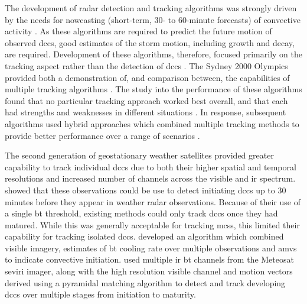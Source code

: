 The development of radar detection and tracking algorithms was strongly driven by the needs for nowcasting (short-term, 30- to 60-minute forecasts) of convective activity \citep{wilson_nowcasting_1998}.
As these algorithms are required to predict the future motion of observed \acrshort{dcc}s, good estimates of the storm motion, including growth and decay, are required.
Development of these algorithms, therefore, focused primarily on the tracking aspect rather than the detection of \acrshort{dcc}s \citep{lakshmanan_objective_2010}.
The Sydney 2000 Olympics provided both a demonstration of, and comparison between, the capabilities of multiple tracking algorithms \citep{keenan_sydney_2003}.
The study into the performance of these algorithms found that no particular tracking approach worked best overall, and that each had strengths and weaknesses in different situations \citep{wilson_sydney_2004}.
In response, subsequent algorithms used hybrid approaches which combined multiple tracking methods to provide better performance over a range of scenarios \citep{lakshmanan_warning_2007, han_3d_2009}.

The second generation of geostationary weather satellites provided greater capability to track individual \acrshort{dcc}s due to both their higher spatial and temporal resolutions and increased number of channels across the visible and \acrshort{ir} spectrum.
\citet{roberts_nowcasting_2003} showed that these observations could be use to detect initiating \acrshort{dcc}s up to 30 minutes before they appear in weather radar observations.
Because of their use of a single \acrshort{bt} threshold, existing methods could only track \acrshort{dcc}s once they had matured.
While this was generally acceptable for tracking \acrshort{mcs}s, this limited their capability for tracking isolated \acrshort{dcc}s.
\citet{mecikalski_forecasting_2006} developed an algorithm which combined visible imagery, estimates of \acrshort{bt} cooling rate over multiple observations and \acrshort{amv}s to indicate convective initiation.
\citet{zinner_cb-tram_2008} used multiple \acrshort{ir} \acrshort{bt} channels from the Meteosat \acrshort{seviri} imager, along with the high resolution visible channel and motion vectors derived using a pyramidal matching algorithm to detect and track developing \acrshort{dcc}s over multiple stages from initiation to maturity.

